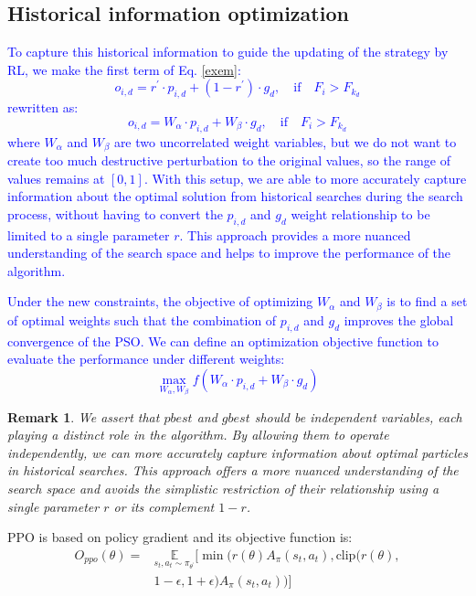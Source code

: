 \documentclass[review]{elsarticle}
\newtheorem{remark}{Remark}
\begin{document}
\subsection{Historical information optimization}
\textcolor{blue}{To capture this historical information to guide the updating of the strategy by RL, we make the first term of Eq. \eqref{exem}:
\begin{equation}
		o_{i,d}=r^{\prime}\cdot p_{i,d}+(1-r^{\prime})\cdot g_{d},\quad \text{if}\quad F_{i}>F_{k_{d}}
\end{equation}
rewritten as:
\begin{equation}
		o_{i,d}=W_{\alpha}\cdot p_{i,d}+W_{\beta}\cdot g_{d},\quad \text{if}\quad F_{i}>F_{k_{d}}
\end{equation}
where $W_{\alpha}$ and $W_{\beta}$ are two uncorrelated weight variables, but we do not want to create too much destructive perturbation to the original values, so the range of values remains at $[0, 1]$. With this setup, we are able to more accurately capture information about the optimal solution from historical searches during the search process, without having to convert the $ p_{i,d}$ and $g_{d}$ weight relationship to be limited to a single parameter $r$. This approach provides a more nuanced understanding of the search space and helps to improve the performance of the algorithm.}
	
\textcolor{blue}{Under the new constraints, the objective of optimizing $W_{\alpha}$ and $W_{\beta}$ is to find a set of optimal weights such that the combination of $ p_{i,d}$ and $g_{d}$ improves the global convergence of the PSO. We can define an optimization objective function to evaluate the performance under different weights:
\begin{equation}
\max_{W_{\alpha}, W_{\beta}} f(W_{\alpha} \cdot p_{i,d} + W_{\beta} \cdot g_{d})
\end{equation}}
\begin{remark}
	\emph{We assert that $pbest$ and $gbest$ should be independent variables, each playing a distinct role in the algorithm. By allowing them to operate independently, we can more accurately capture information about optimal particles in historical searches. This approach offers a more nuanced understanding of the search space and avoids the simplistic restriction of their relationship using a single parameter $r$ or its complement $1-r$.}
\end{remark}

PPO is based on policy gradient and its objective function is:
\begin{equation}
	\begin{split}
	O_{ppo}(\theta) = & \underset{s_{t}, a_{t} \sim \pi_{\theta^{\prime}}}{\mathbb{E}} [\min( r(\theta)A_{\pi}(s_{t},a_{t}),\text{clip}(r(\theta),\\
	&1-\epsilon,1+\epsilon)A_{\pi}(s_{t}, a_{t}))]
	\end{split}
\end{equation}
\end{document}
